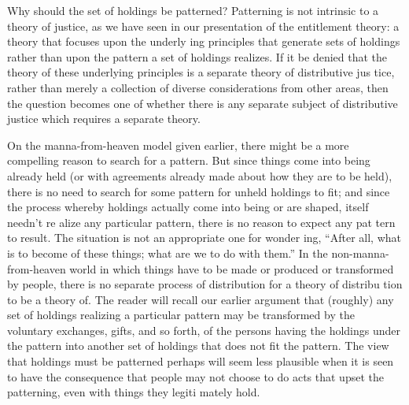 \documentclass[11pt,openany]{book}
\begin{document}
Why should the set of holdings be patterned? Patterning is not intrinsic to a theory of justice, as we have seen in our presentation of the entitlement theory: a theory that focuses upon the underly ing principles that generate sets of holdings rather than upon the pattern a set of holdings realizes. If it be denied that the theory of these underlying principles is a separate theory of distributive jus tice, rather than merely a collection of diverse considerations from other areas, then the question becomes one of whether there is any separate subject of distributive justice which requires a separate theory. 

On the manna-from-heaven model given earlier, there might be a more compelling reason to search for a pattern. But since things come into being already held (or with agreements already made about how they are to be held), there is no need to search for some pattern for unheld holdings to fit; and since the process whereby holdings actually come into being or are shaped, itself needn't re alize any particular pattern, there is no reason to expect any pat tern to result. The situation is not an appropriate one for wonder ing, ``After all, what is to become of these things; what are we to do with them.'' In the non-manna-from-heaven world in which things have to be made or produced or transformed by people, there is no separate process of distribution for a theory of distribu tion to be a theory of. The reader will recall our earlier argument that (roughly) any set of holdings realizing a particular pattern may be transformed by the voluntary exchanges, gifts, and so forth, of the persons having the holdings under the pattern into another set of holdings that does not fit the pattern. The view that holdings must be patterned perhaps will seem less plausible when it is seen to have the consequence that people may not choose to do acts that upset the patterning, even with things they legiti mately hold. 
\end{document}
